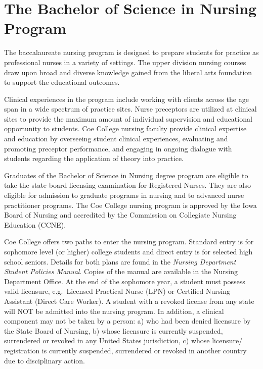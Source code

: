 \documentclass[
  letterpaper,
]{scrbook}
\begin{document}
\section{The Bachelor of Science in Nursing
Program}\label{the-bachelor-of-science-in-nursing-program}

The baccalaureate nursing program is designed to prepare students for
practice as professional nurses in a variety of settings. The upper
division nursing courses draw upon broad and diverse knowledge gained
from the liberal arts foundation to support the educational outcomes.

Clinical experiences in the program include working with clients across
the age span in a wide spectrum of practice sites. Nurse preceptors are
utilized at clinical sites to provide the maximum amount of individual
supervision and educational opportunity to students. Coe College nursing
faculty provide clinical expertise and education by overseeing student
clinical experiences, evaluating and promoting preceptor performance,
and engaging in ongoing dialogue with students regarding the application
of theory into practice.

Graduates of the Bachelor of Science in Nursing degree program are
eligible to take the state board licensing examination for Registered
Nurses. They are also eligible for admission to graduate programs in
nursing and to advanced nurse practitioner programs. The Coe College
nursing program is approved by the Iowa Board of Nursing and accredited
by the Commission on Collegiate Nursing Education (CCNE).

Coe College offers two paths to enter the nursing program. Standard
entry is for sophomore level (or higher) college students and direct
entry is for selected high school seniors. Details for both plans are
found in the \emph{Nursing Department Student Policies Manual}. Copies
of the manual are available in the Nursing Department Office. At the end
of the sophomore year, a student must possess valid licensure,
e.g.~Licensed Practical Nurse (LPN) or Certified Nursing Assistant
(Direct Care Worker). A student with a revoked license from any state
will NOT be admitted into the nursing program. In addition, a clinical
component may not be taken by a person: a) who had been denied licensure
by the State Board of Nursing, b) whose licensure is currently
suspended, surrendered or revoked in any United States jurisdiction, c)
whose licensure/ registration is currently suspended, surrendered or
revoked in another country due to disciplinary action.
\end{document}
